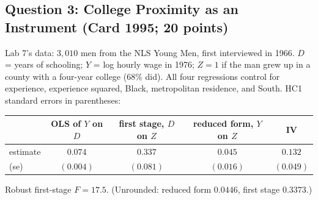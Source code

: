 \documentclass[11pt]{article}
\begin{document}
\newpage
\subsection*{Question 3: College Proximity as an Instrument (Card 1995; 20 points)}
Lab 7's data: $3{,}010$ men from the NLS Young Men, first interviewed in 1966. $D$ = years of
schooling; $Y$ = log hourly wage in 1976; $Z = 1$ if the man grew up in a county with a
four-year college ($68\%$ did). All four regressions control for experience, experience
squared, Black, metropolitan residence, and South. HC1 standard errors in parentheses:
\begin{center}\small
\renewcommand{\arraystretch}{1.15}
\begin{tabular}{lcccc}
\toprule
 & OLS of $Y$ on $D$ & first stage, $D$ on $Z$ & reduced form, $Y$ on $Z$ & IV \\
\midrule
estimate & $0.074$ & $0.337$ & $0.045$ & $0.132$ \\
(se) & $(0.004)$ & $(0.081)$ & $(0.016)$ & $(0.049)$ \\
\bottomrule
\end{tabular}
\end{center}
Robust first-stage $F = 17.5$. (Unrounded: reduced form $0.0446$, first stage $0.3373$.)
\end{document}
